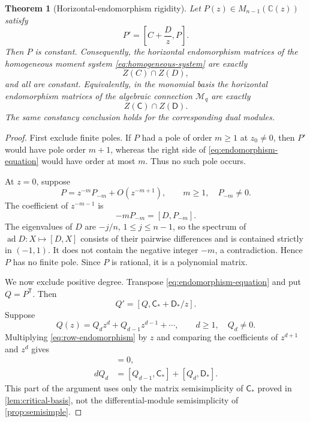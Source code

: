 \documentclass[11pt]{article}
\numberwithin{equation}{section}
\newtheorem{theorem}{Theorem}[section]
\theoremstyle{definition}
\theoremstyle{remark}
\newcommand{\C}{\mathbb C}
\newcommand{\Mcal}{\mathcal M}
\begin{document}
\begin{theorem}[Horizontal-endomorphism rigidity]\label{thm:end-rigidity}
Let $P(z)\in M_{n-1}(\C(z))$ satisfy
\begin{equation}\label{eq:endomorphism-equation}
  P'=\left[C+\frac Dz,P\right].
\end{equation}
Then $P$ is constant.  Consequently, the horizontal endomorphism matrices of
the homogeneous moment system \eqref{eq:homogeneous-system} are exactly
\[
  Z(C)\cap Z(D),
\]
and all are constant.  Equivalently, in the monomial basis the horizontal
endomorphism matrices of the algebraic connection $\Mcal_q$ are exactly
\[
  Z(\mathsf C)\cap Z(\mathsf D).
\]
The same constancy conclusion holds for the corresponding dual modules.
\end{theorem}

\begin{proof}
First exclude finite poles.  If $P$ had a pole of order $m\ge1$ at
$z_0\ne0$, then $P'$ would have pole order $m+1$, whereas the right side of
\eqref{eq:endomorphism-equation} would have order at most $m$.  Thus no such
pole occurs.

At $z=0$, suppose
\[
  P=z^{-m}P_{-m}+O(z^{-m+1}),
  \qquad m\ge1,
  \quad P_{-m}\ne0.
\]
The coefficient of $z^{-m-1}$ is
\[
  -mP_{-m}=[D,P_{-m}].
\]
The eigenvalues of $D$ are $-j/n$, $1\le j\le n-1$, so the spectrum of
$\operatorname{ad}D:X\mapsto[D,X]$ consists of their pairwise differences
and is contained strictly in $(-1,1)$.  It does not contain the negative
integer $-m$, a contradiction.  Hence $P$ has no finite pole.  Since $P$ is
rational, it is a polynomial matrix.

We now exclude positive degree.  Transpose
\eqref{eq:endomorphism-equation} and put $Q=P^{\mathsf T}$.  Then
\begin{equation}\label{eq:row-endomorphism}
  Q'=[Q,\mathsf C_*+\mathsf D_*/z].
\end{equation}
Suppose
\[
  Q(z)=Q_dz^d+Q_{d-1}z^{d-1}+\cdots,
  \qquad d\ge1,
  \quad Q_d\ne0.
\]
Multiplying \eqref{eq:row-endomorphism} by $z$ and comparing the coefficients
of $z^{d+1}$ and $z^d$ gives
\begin{align}
  [Q_d,\mathsf C_*]&=0,\label{eq:leading-commute}\\
  dQ_d&=[Q_{d-1},\mathsf C_*]+[Q_d,\mathsf D_*].
  \label{eq:next-leading}
\end{align}
This part of the argument uses only the matrix semisimplicity of
$\mathsf C_*$ proved in \cref{lem:critical-basis}, not the differential-module
semisimplicity of \cref{prop:semisimple}.


\end{proof}
\end{document}
